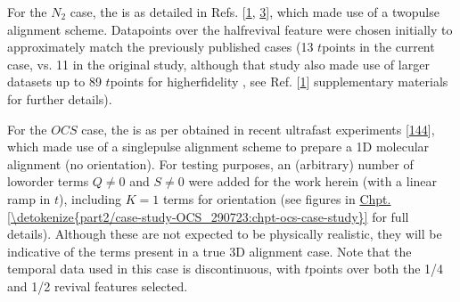 \documentclass[letterpaper,table,10pt,english]{jupyterBook}
\begin{document}
\sphinxAtStartPar
For the \(N_2\) case, the {\hyperref[\detokenize{backmatter/glossary:term-RWP}]{}} is as detailed in Refs. {[}\hyperlink{cite.backmatter/bibliography:id776}{1}, \hyperlink{cite.backmatter/bibliography:id686}{3}{]}, which made use of a two\sphinxhyphen{}pulse alignment scheme. Data\sphinxhyphen{}points over the {\hyperref[\detokenize{backmatter/glossary:term-RWP}]{}} half\sphinxhyphen{}revival feature were chosen initially to approximately match the previously published cases (13 \(t\)\sphinxhyphen{}points in the current case, vs. 11 in the original study, although that study also made use of larger datasets up to 89 \(t\)\sphinxhyphen{}points for higher\sphinxhyphen{}fidelity {\hyperref[\detokenize{backmatter/glossary:term-bootstrap-retrieval-protocol}]{}}, see Ref. {[}\hyperlink{cite.backmatter/bibliography:id776}{1}{]} supplementary materials for further details).

\sphinxAtStartPar
For the \(OCS\) case, the {\hyperref[\detokenize{backmatter/glossary:term-RWP}]{}} is as per obtained in recent ultrafast experiments {[}\hyperlink{cite.backmatter/bibliography:id972}{144}{]}, which made use of a single\sphinxhyphen{}pulse alignment scheme to prepare a 1D molecular alignment (no orientation). For testing purposes, an (arbitrary) number of low\sphinxhyphen{}order terms \(Q\neq0\) and \(S\neq0\) were added for the work herein (with a linear ramp in \(t\)), including \(K=1\) terms for orientation (see figures in \hyperref[\detokenize{part2/case-study-OCS_290723:chpt-ocs-case-study}]{Chpt.\@ \ref{\detokenize{part2/case-study-OCS_290723:chpt-ocs-case-study}}} for full details). Although these are not expected to be physically realistic, they will be indicative of the terms present in a true 3D alignment case. Note that the temporal data used in this case is discontinuous, with \(t\)\sphinxhyphen{}points over both the 1/4 and 1/2 {\hyperref[\detokenize{backmatter/glossary:term-RWP}]{}} revival features selected.
\end{document}

